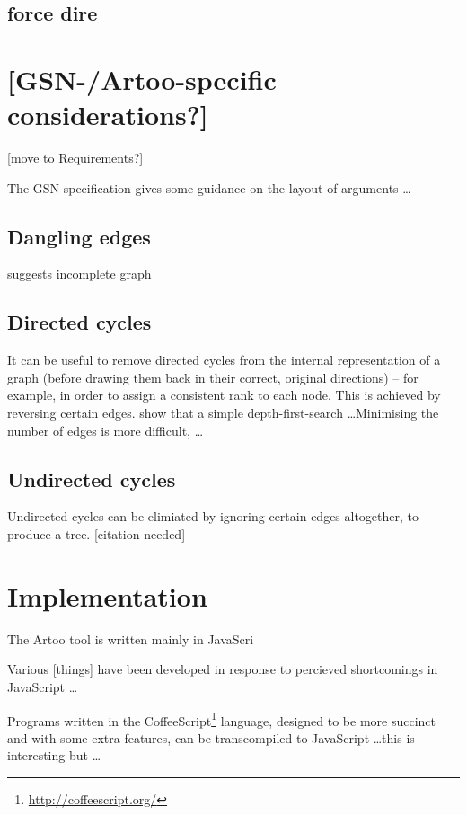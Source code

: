\documentclass[authoryearcitations]{UoYCSproject}
\begin{document}
\subsection{force dire}

\section{[GSN-/Artoo-specific considerations?]}

[move to Requirements?]

The GSN specification \citep[section~2.2, pp.~26--27]{gsnstandard} gives some guidance on the layout of arguments \ldots



\subsection{Dangling edges}

suggests incomplete graph

\subsection{Directed cycles}

It can be useful to remove directed cycles from the internal representation of a graph
(before drawing them back in their correct, original directions)
-- for example, in order to assign a consistent rank to each node.
This is achieved by reversing certain edges.
\citet{gansner1993} show that a simple depth-first-search \ldots  Minimising the number of edges is more difficult, \citeauthor{gansner1993} \ldots

\subsection{Undirected cycles}

Undirected cycles can be elimiated by ignoring certain edges altogether, to produce a tree.  [citation needed]



\section{Implementation}

The Artoo tool is written mainly in JavaScri

Various [things] have been developed in response to percieved shortcomings in JavaScript \ldots

Programs written in the CoffeeScript\footnote{\url{http://coffeescript.org/}} language, designed to be more succinct and with some extra features, can be transcompiled to JavaScript \ldots this is interesting but \ldots
\end{document}
